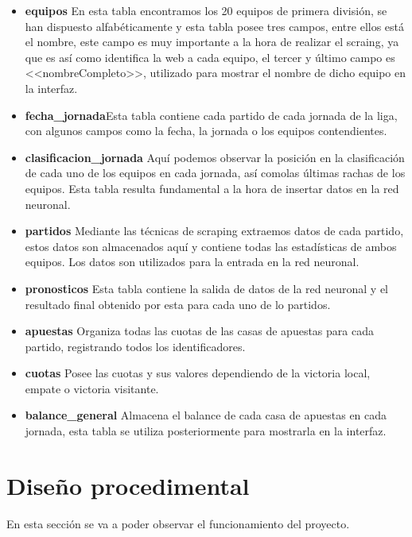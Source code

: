 \begin{itemize}
\item \textbf{equipos} En esta tabla encontramos los 20 equipos de primera división, se han dispuesto alfabéticamente y esta tabla posee tres campos, entre ellos está el nombre, este campo es muy importante a la hora de realizar el scraing, ya que es así como identifica la web a cada equipo, el tercer y último campo es <<nombreCompleto>>, utilizado para mostrar el nombre de dicho equipo en la interfaz.

\item \textbf{fecha\_jornada}Esta tabla contiene cada partido de cada jornada de la liga, con algunos campos como la fecha, la jornada o los equipos contendientes.

\item \textbf{clasificacion\_jornada} Aquí podemos observar la posición en la clasificación de cada uno de los equipos en cada jornada, así comolas últimas rachas de los equipos. Esta tabla resulta fundamental a la hora de insertar datos en la red neuronal.

\item \textbf{partidos} Mediante las técnicas de scraping extraemos datos de cada partido, estos datos son almacenados aquí y contiene todas las estadísticas de ambos equipos. Los datos son utilizados para la entrada en la red neuronal.

\item \textbf{pronosticos} Esta tabla contiene la salida de datos de la red neuronal y el resultado final obtenido por esta para cada uno de lo partidos.

\item \textbf{apuestas} Organiza todas las cuotas de las casas de apuestas para cada partido, registrando todos los identificadores.

\item \textbf{cuotas} Posee las cuotas y sus valores dependiendo de la victoria local, empate o victoria visitante.

\item \textbf{balance\_general} Almacena el balance de cada casa de apuestas en cada jornada, esta tabla se utiliza posteriormente para mostrarla en la interfaz.
\end{itemize}
\section{Diseño procedimental}
En esta sección se va a poder observar el funcionamiento del proyecto.

